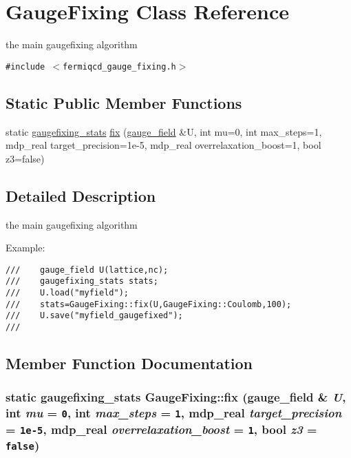 \hypertarget{class_gauge_fixing}{
\section{GaugeFixing Class Reference}
\label{class_gauge_fixing}
}
the main gaugefixing algorithm  


{\tt \#include $<$fermiqcd\_\-gauge\_\-fixing.h$>$}

\subsection*{Static Public Member Functions}
\begin{CompactItemize}
\item 
static \hyperlink{classgaugefixing__stats}{gaugefixing\_\-stats} \hyperlink{class_gauge_fixing_71359f7c7bd14c3c5d548cbf7e6793c5}{fix} (\hyperlink{classgauge__field}{gauge\_\-field} \&U, int mu=0, int max\_\-steps=1, mdp\_\-real target\_\-precision=1e-5, mdp\_\-real overrelaxation\_\-boost=1, bool z3=false)
\end{CompactItemize}


\subsection{Detailed Description}
the main gaugefixing algorithm 

Example: 

\footnotesize\begin{verbatim}
///    gauge_field U(lattice,nc);
///    gaugefixing_stats stats;
///    U.load("myfield");
///    stats=GaugeFixing::fix(U,GaugeFixing::Coulomb,100);
///    U.save("myfield_gaugefixed");
/// \end{verbatim}
\normalsize
 

\subsection{Member Function Documentation}
\hypertarget{class_gauge_fixing_71359f7c7bd14c3c5d548cbf7e6793c5}{
\subsubsection[{fix}]{\setlength{\rightskip}{0pt plus 5cm}static {\bf gaugefixing\_\-stats} GaugeFixing::fix ({\bf gauge\_\-field} \& {\em U}, \/  int {\em mu} = {\tt 0}, \/  int {\em max\_\-steps} = {\tt 1}, \/  mdp\_\-real {\em target\_\-precision} = {\tt 1e-5}, \/  mdp\_\-real {\em overrelaxation\_\-boost} = {\tt 1}, \/  bool {\em z3} = {\tt false})}}
\label{class_gauge_fixing_71359f7c7bd14c3c5d548cbf7e6793c5}


